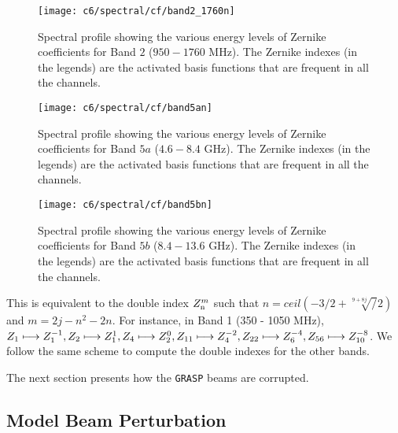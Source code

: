 \begin{figure}[H]
\centering
\texttt{[image: c6/spectral/cf/band2\_1760n]} %
\caption{\label{fig:band2spec} Spectral profile showing the various energy levels of Zernike coefficients for Band $2$ ($950 - 1760$ MHz).
The Zernike indexes (in the legends) are the activated basis functions that are frequent in all the channels.}
\end{figure}
\FloatBarrier

\begin{figure}[H]
\centering
\texttt{[image: c6/spectral/cf/band5an]}
\caption{\label{fig:band5an} Spectral profile showing the various energy levels of Zernike coefficients for Band $5a$ ($4.6 - 8.4$ GHz). The Zernike indexes (in the legends) are the activated basis functions that are frequent in all the channels.}
\end{figure}
\FloatBarrier

\begin{figure}[H]
\centering
\texttt{[image: c6/spectral/cf/band5bn]}
\caption{\label{fig:band5bspec} Spectral profile showing the various energy levels of Zernike coefficients for Band $5b$ ($8.4 - 13.6$ GHz). The Zernike indexes (in the legends) are the activated basis functions that are frequent in all the channels.} 
\end{figure}
\FloatBarrier

\noindent This is equivalent to the double index $Z_{\rm n}^{m}$ such that $n = ceil(-3/2 + \surd[9 + 8j]/2)$ and $m = 2j -n^2 - 2n$. For instance, in Band 1 (350 - 1050 MHz), $Z_{\rm 1} \longmapsto Z_{\rm 1}^{-1}, Z_{\rm 2} \longmapsto Z_{\rm 1}^{1}, Z_{\rm 4} \longmapsto Z_{\rm 2}^{0}, Z_{\rm 11} \longmapsto Z_{\rm 4}^{-2}, Z_{\rm 22} \longmapsto Z_{\rm 6}^{-4}, Z_{\rm 56} \longmapsto Z_{\rm 10}^{-8}$. We follow the same scheme to compute the double indexes for the other bands.


The next section presents how the {\tt GRASP} beams are corrupted.

\subsection{Model Beam Perturbation}	  \label{chap6:mbp} 

